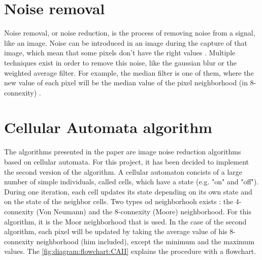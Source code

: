 \begin{minipage}{0.5\textwidth}

\section{Noise removal}


Noise removal, or noise reduction, is the process of removing noise from a signal, like an image. Noise can be introduced in an image during the capture of that image, which mean that some pixels don't have the right values \cite{bib:noise:wikipedia}. Multiple techniques exist in order to remove this noise, like the gaussian blur or the weighted average filter. For example, the median filter is one of them, where the new value of each pixel will be the median value of the pixel neighborhood (in 8-connexity) \cite{bib:noise:ImageFiltering}.


\section{Cellular Automata algorithm}

The algorithms presented in the paper \cite{bib:filter:CA} are image noise reduction algorithms based on cellular automata. For this project, it has been decided to implement the second version of the algorithm. A cellular automaton concists of a large number of simple individuals, called cells, which have a state (e.g. "on" and "off"). During one iteration, each cell updates its state depending on its own state and on the state of the neighbor cells. Two types od neighborhooh exists : the 4-connexity (Von Neumann) and the 8-connexity (Moore) neighborhood. For this algorithm, it is the Moor neighborhood that is used. In the case of the second algorithm, each pixel will be updated by taking the average value of his 8-connexity neighborhood (him included), except the minimum and the maximum values. The \vref{fig:diagram:flowchart:CAII} explains the procedure with a flowchart.


\end{minipage} \hfill 
